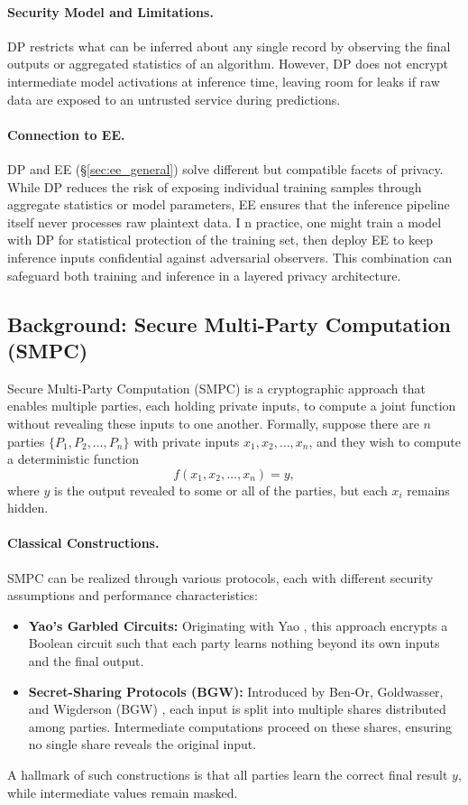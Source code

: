 \documentclass[10pt]{article}
\begin{document}
\paragraph{Security Model and Limitations.}
DP restricts what can be inferred about any single record by observing the final outputs or aggregated statistics of an algorithm. However, DP does not encrypt intermediate model activations at inference time, leaving room for leaks if raw data are exposed to an untrusted service during predictions.

\paragraph{Connection to EE.}
DP and EE (\S\ref{sec:ee_general}) solve different but compatible facets of privacy. 
While DP reduces the risk of exposing individual training samples through aggregate statistics or model parameters, EE ensures that the inference pipeline itself never processes raw plaintext data. I
n practice, one might train a model with DP for statistical protection of the training set, then deploy EE to keep inference inputs confidential against adversarial observers. This combination can safeguard both training and inference in a layered privacy architecture.

\subsection{Background: Secure Multi-Party Computation (SMPC)}
\label{sec:smpc_background}

Secure Multi-Party Computation (SMPC) is a cryptographic approach that enables multiple parties, each holding private inputs, to compute a joint function without revealing these inputs to one another. 
Formally, suppose there are $n$ parties $\{P_1, P_2, \dots, P_n\}$ with private inputs $x_1, x_2, \dots, x_n$, and they wish to compute a deterministic function
\[
f(x_1, x_2, \dots, x_n) = y,
\]
where $y$ is the output revealed to some or all of the parties, but each $x_i$ remains hidden.

\paragraph{Classical Constructions.}
SMPC can be realized through various protocols, each with different security assumptions and performance characteristics:
\begin{itemize}
    \item \textbf{Yao’s Garbled Circuits:} Originating with Yao \cite{Yao1982}, this approach encrypts a Boolean circuit such that each party learns nothing beyond its own inputs and the final output. 
    \item \textbf{Secret-Sharing Protocols (BGW):} Introduced by Ben-Or, Goldwasser, and Wigderson (BGW) \cite{BGW1988}, each input is split into multiple shares distributed among parties. Intermediate computations proceed on these shares, ensuring no single share reveals the original input.
\end{itemize}
A hallmark of such constructions is that all parties learn the correct final result $y$, while intermediate values remain masked.
\end{document}

